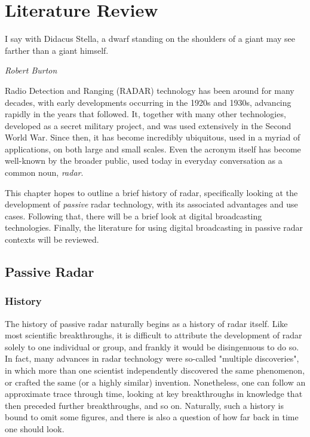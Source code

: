 \documentclass[class=report,11pt,crop=false]{standalone}
\begin{document}
\chapter{Literature Review}
\epigraph{I say with Didacus Stella, a dwarf standing on the shoulders of a giant may see farther than a giant himself.}%
    {\emph{Robert Burton}}

Radio Detection and Ranging (RADAR) technology has been around for many decades, with early developments occurring in the 1920s and 1930s, advancing rapidly in the years that followed. It, together with many other technologies, developed as a secret military project, and was used extensively in the Second World War. Since then, it has become incredibly ubiquitous, used in a myriad of applications, on both large and small scales. Even the acronym itself has become well-known by the broader public, used today in everyday conversation as a common noun, \emph{radar}.

This chapter hopes to outline a brief history of radar, specifically looking at the development of \emph{passive} radar technology, with its associated advantages and use cases. Following that, there will be a brief look at digital broadcasting technologies. Finally, the literature for using digital broadcasting in passive radar contexts will be reviewed.

\section{Passive Radar}

\subsection{History}
The history of passive radar naturally begins as a history of radar itself. Like most scientific breakthroughs, it is difficult to attribute the development of radar solely to one individual or group, and frankly it would be disingenuous to do so. In fact, many advances in radar technology were so-called "multiple discoveries", in which more than one scientist independently discovered the same phenomenon, or crafted the same (or a highly similar) invention. Nonetheless, one can follow an approximate trace through time, looking at key breakthroughs in knowledge that then preceded further breakthroughs, and so on. Naturally, such a history is bound to omit some figures, and there is also a question of how far back in time one should look.
\end{document}
